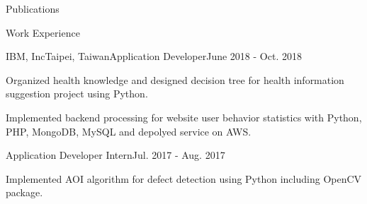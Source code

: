 \documentclass{resume} %
\begin{document}
\begin{rSection}{Publications}
    
    
    \begin{enumerate}[label={[\arabic*]}]
    \item {}
    \item {}
    \item {}
    \item {}
    \end{enumerate}    
\end{rSection}


\begin{rSection}{Work Experience}
    \begin{rSubsection}{IBM, Inc}{Taipei, Taiwan}{Application Developer}{June 2018 - Oct. 2018}
        \item Organized health knowledge and designed decision tree for health information suggestion project using Python.
        \item Implemented backend processing for website user behavior statistics with Python, PHP, MongoDB, MySQL and depolyed service on AWS.
    \end{rSubsection}
    \begin{rSubsection2}{Application Developer Intern}{Jul. 2017 - Aug. 2017}
        \item Implemented AOI algorithm for defect detection using Python including OpenCV package.
    \end{rSubsection2}
\end{rSection}
\end{document}
